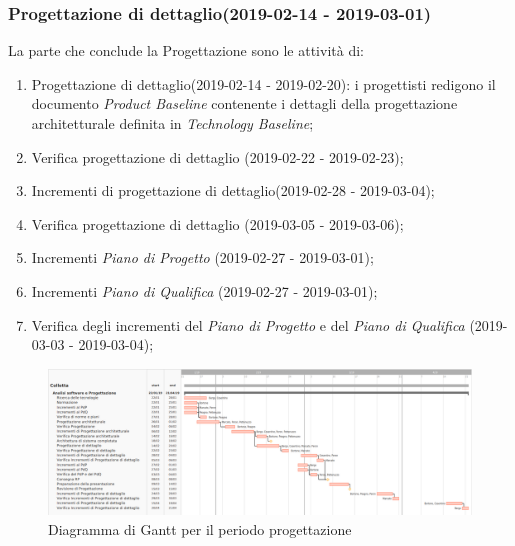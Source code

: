 		\subsubsection{Progettazione di dettaglio(2019-02-14 - 2019-03-01)\\} La parte che conclude la Progettazione sono le attività di:
			\begin{enumerate}[label = 3.3.\arabic*)]
				\item Progettazione di dettaglio(2019-02-14 - 2019-02-20): i progettisti redigono il documento \textit{Product Baseline} contenente i dettagli della progettazione architetturale definita in \textit{Technology Baseline};
				\item Verifica progettazione di dettaglio (2019-02-22 - 2019-02-23);
				\item Incrementi di progettazione di dettaglio(2019-02-28 - 2019-03-04);
				\item Verifica progettazione di dettaglio (2019-03-05 - 2019-03-06);
				\item Incrementi \textit{Piano di Progetto} (2019-02-27 - 2019-03-01);
				\item Incrementi \textit{Piano di Qualifica} (2019-02-27 - 2019-03-01);	
				\item Verifica degli incrementi del \textit{Piano di Progetto} e del \textit{Piano di Qualifica} (2019-03-03 - 2019-03-04);
			\end{enumerate}
	
	\begin{figure}[!hbtp]
		\centering
		\includegraphics[scale=0.5,angle=90]{images/ganttprog.png}
		\caption{Diagramma di Gantt per il periodo progettazione}
	\end{figure}
	
